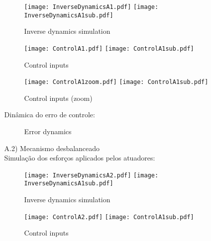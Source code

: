 \begin{itemize}
\begin{itemize}
\begin{figure}[H]
\centering
\begin{minipage}[b]{0.45\linewidth}
\texttt{[image: InverseDynamicsA1.pdf]}
\texttt{[image: InverseDynamicsA1sub.pdf]}
\label{fig:InverseDynamicsA1}
\caption{Inverse dynamics simulation}
\end{minipage}
\quad
\begin{minipage}[b]{0.45\linewidth}
\texttt{[image: ControlA1.pdf]}
\texttt{[image: ControlA1sub.pdf]}
\label{fig:ControlA1}
\caption{Control inputs}
\end{minipage}
\quad
\begin{minipage}[b]{0.45\linewidth}
\texttt{[image: ControlA1zoom.pdf]}
\texttt{[image: ControlA1sub.pdf]}
\label{fig:ControlA1}
\caption{Control inputs (zoom)}
\end{minipage}
\end{figure}

Din\^amica do erro de controle:

\begin{figure}[H]
\centering
{}
\quad
{}
%
\caption{Error dynamics}
\label{fig:figure}
\end{figure}

\item[A.2)] Mecanismo desbalanceado \\

Simula\c{c}\~ao dos esfor\c{c}os aplicados pelos atuadores:

\begin{figure}[H]
\centering
\begin{minipage}[b]{0.45\linewidth}
\texttt{[image: InverseDynamicsA2.pdf]}
\texttt{[image: InverseDynamicsA1sub.pdf]}
\label{fig:InverseDynamicsA2}
\caption{Inverse dynamics simulation}
\end{minipage}
\quad
\begin{minipage}[b]{0.45\linewidth}
\texttt{[image: ControlA2.pdf]}
\texttt{[image: ControlA1sub.pdf]}
\label{fig:ControlA2}
\caption{Control inputs}
\end{minipage}
\end{figure}


\end{itemize}
\end{itemize}
